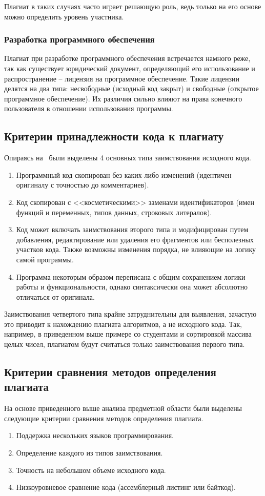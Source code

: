 Плагиат в таких случаях часто играет решающую роль, ведь только на его основе можно определить уровень участника.

\subsubsection{Разработка программного обеспечения}
Плагиат при разработке программного обеспечения встречается намного реже, так как существует юридический документ, определяющий  его использование и распространение -- лицензия на программное обеспечение. Такие лицензии делятся на два типа: несвободные (исходный код закрыт) и свободные (открытое программное обеспечение). Их различия сильно влияют на права конечного пользователя в отношении использования программы.

\subsection{Критерии принадлежности кода к плагиату}
Опираясь на~\cite{treb} были выделены 4 основных типа заимствования исходного кода.
 \begin{enumerate}
 	\item Программный код скопирован без каких-либо изменений (идентичен оригиналу с точностью до комментариев).
 	\item Код скопирован с <<косметическими>> заменами идентификаторов (имен функций и переменных, типов данных, строковых литералов).
 	\item Код может включать заимствования второго типа и модифицирован путем добавления, редактирование или удаления его фрагментов или бесполезных участков кода. Также возможны изменения порядка, не влияющие на логику самой программы.
 	\item Программа некоторым образом переписана с общим сохранением логики работы и функциональности, однако синтаксически она может абсолютно отличаться от оригинала.
 \end{enumerate}

Заимствования четвертого типа крайне затруднительны для выявления, зачастую это приводит к нахождению плагиата алгоритмов, а не исходного кода. Так, например, в приведенном выше примере со студентами и сортировкой массива целых чисел, плагиатом будут считаться только заимствования первого типа.

\subsection{Критерии сравнения методов определения плагиата}
На основе приведенного выше анализа предметной области были выделены следующие критерии сравнения методов определения плагиата.
\begin{enumerate}
	\item Поддержка нескольких языков программирования.
	\item Определение каждого из типов заимствования.
	\item Точность на небольшом объеме исходного кода. 
	\item Низкоуровневое сравнение кода (ассемблерный листинг или байткод).
\end{enumerate}

